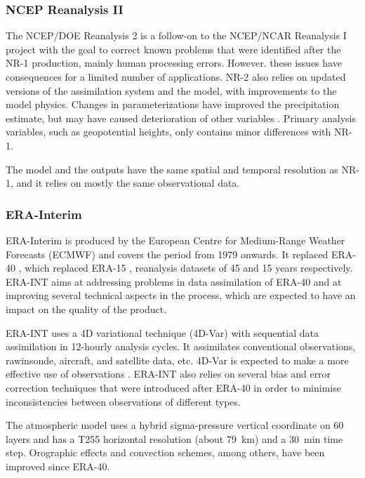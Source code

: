 \documentclass{ametsoc}
\begin{document}
\subsubsection{NCEP Reanalysis II}

The NCEP/DOE Reanalysis 2 \citep[NR-2,][]{Kanamitsu2002} is a follow-on to the NCEP/NCAR Reanalysis I project with the goal to correct known problems that were identified after the NR-1 production, mainly human processing errors. However. these issues have consequences for a limited number of applications. NR-2 also relies on updated versions of the assimilation system and the model, with improvements to the model physics. Changes in parameterizations have improved the precipitation estimate, but may have caused deterioration of other variables \citep{Kistler2001, Kanamitsu2002}. Primary analysis variables, such as geopotential heights, only contains minor differences with NR-1.

The model and the outputs have the same spatial and temporal resolution as NR-1, and it relies on mostly the same observational data.


\subsubsection{ERA-Interim}

ERA-Interim \citep[ERA-INT, ][]{Dee2011a} is produced by the European Centre for Medium-Range Weather Forecasts (ECMWF) and covers the period from 1979 onwards. It replaced ERA-40 \citep{Uppala2005}, which replaced ERA-15 \citep{Gibson1997}, reanalysis datasets of 45 and 15 years respectively. ERA-INT aims at addressing problems in data assimilation of ERA-40 and at improving several technical aspects in the process, which are expected to have an impact on the quality of the product.

ERA-INT uses a 4D variational technique (4D-Var) with sequential data assimilation in 12-hourly analysis cycles. It assimilates conventional observations, rawinsonde, aircraft, and satellite data, etc. 4D-Var is expected to make a more effective use of observations \citep{Dee2011a}. ERA-INT also relies on several bias and error correction techniques that were introduced after ERA-40 in order to minimise inconsistencies between observations of different types.

The atmospheric model uses a hybrid sigma-pressure vertical coordinate on 60 layers and has a T255 horizontal resolution (about 79~km) and a 30~min time step. Orographic effects and convection schemes, among others, have been improved since ERA-40.
\end{document}
